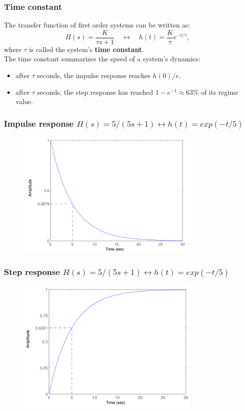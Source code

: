 \begin{frame}
\frametitle{Time constant}
The transfer function of first order systems can be written as:
\begin{equation*}
H(s) = \frac{K}{\tau s + 1}\quad \leftrightarrow \quad h(t) = \frac{K}{\tau} e^{-t/\tau},
\end{equation*}
where $\tau$ is called the system's \textbf{time constant}.\\
The time constant summarizes the speed of a system's dynamics:
\begin{itemize}
\item after $\tau$ seconds, the impulse response reaches $h(0)/e$.
\item after $\tau$ seconds, the step response has reached $1-e^{-1}\approx63\%$ of its regime value.
\end{itemize}
\end{frame}

\begin{frame}
\frametitle{Impulse response $H(s)=5/(5s+1) \leftrightarrow h(t)=exp(-t/5)$}
\begin{figure}
\centering
\includegraphics[width=0.8\textwidth]{time-constant-impulse.png}
\end{figure}
\end{frame}

\begin{frame}
\frametitle{Step response $H(s)=5/(5s+1) \leftrightarrow h(t)=exp(-t/5)$}
\begin{figure}
\centering
\includegraphics[width=0.8\textwidth]{time-constant-step.png}
\end{figure}
\end{frame}

